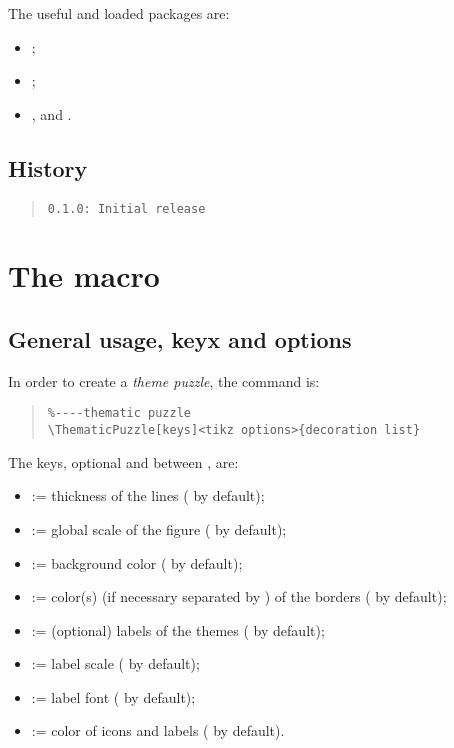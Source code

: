 \documentclass[11pt,a4paper]{ltxdoc}
\begin{document}
The useful and loaded packages are:

\begin{itemize}
	\item {};
	\item {};
	\item {},  and .
\end{itemize}

\vfill

\subsection{History}

\begin{quote}
\begin{verbatim}
0.1.0: Initial release
\end{verbatim}
\end{quote}

\pagebreak

\section{The macro}

\subsection{General usage, keyx and options}

In order to create a \textit{theme puzzle}, the command is:

\begin{quote}
\begin{verbatim}
%----thematic puzzle
\ThematicPuzzle[keys]<tikz options>{decoration list}
\end{verbatim}
\end{quote}

The \textsf{keys}, optional and between \MontreCode{[...]}, are:

\begin{itemize}
	\item {} := thickness of the lines (\MontreCode{1pt} by default);
	\item {} := global scale of the figure ( by default);
	\item {} := background color ( by default);
	\item {} := color(s) (if necessary separated by \MontreCode{,}) of the borders ( by default);
	\item {} := (optional) labels of the themes ( by default);
	\item {} := label scale ( by default);
	\item {} := label font ( by default);
	\item {} := color of icons and labels ( by default).
\end{itemize}
\end{document}
